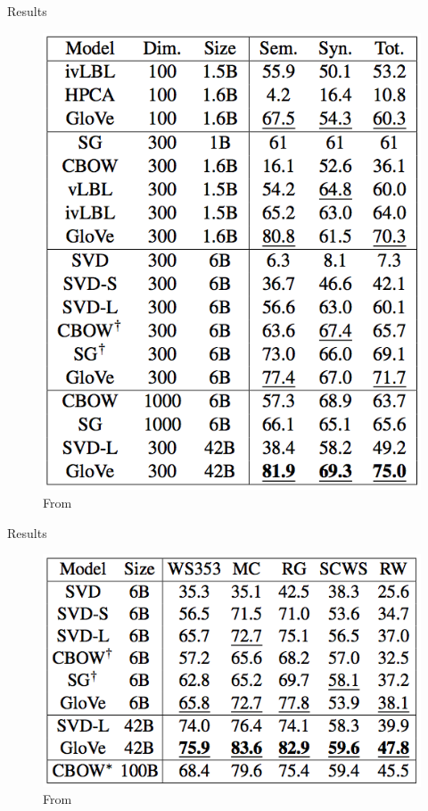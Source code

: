 \begin{frame}{Results}
  \begin{figure}
    \includegraphics[scale=0.27]{images/results1.png}
    \caption{From}
  \end{figure}
\end{frame}

\begin{frame}{Results}
  \begin{figure}
    \includegraphics[scale=0.27]{images/results2.png}
    \caption{From}
  \end{figure}
\end{frame}

